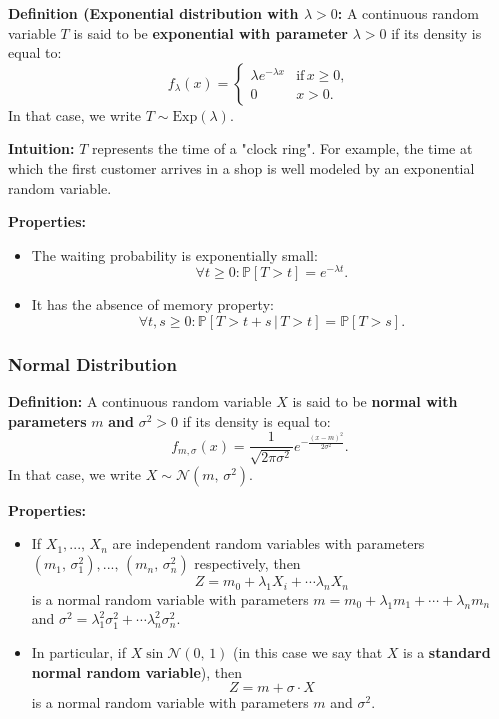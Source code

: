 \documentclass[a4paper]{extarticle}
\begin{document}
\textbf{Definition (Exponential distribution with \(\lambda > 0\):} A continuous random variable \(T\) is said to be \textbf{exponential with parameter} \(\lambda > 0\) if its density is equal to:
\[
    f_{\lambda}(x) = \begin{cases}
        \lambda e^{-\lambda x} & \text{if} \, x \geq 0,\\
        0 & x > 0.
    \end{cases}
\]
In that case, we write \(T \sim \text{Exp}(\lambda)\).

\textbf{Intuition:} \(T\) represents the time of a "clock ring". For example, the time at which the first customer arrives in a shop is well modeled by an exponential random variable.

\textbf{Properties:}
\begin{itemize}
    \item The waiting probability is exponentially small:
    \[
        \forall t \geq 0 : \mathbb{P}[T > t] = e^{-\lambda t}.
    \]
    \item It has the absence of memory property:
    \[
        \forall t, s \geq 0 : \mathbb{P}[T > t + s \, | \, T > t] = \mathbb{P}[T > s].
    \]
\end{itemize}

\subsubsection{Normal Distribution}

\textbf{Definition:} A continuous random variable \(X\) is said to be \textbf{normal with parameters} \(m\) \textbf{and} \(\sigma^2 > 0\) if its density is equal to:
\[
    f_{m, \sigma}(x) = \frac{1}{\sqrt{2 \pi \sigma^2}} e^{-\frac{(x - m)^2}{2 \sigma^2}}.
\]
In that case, we write \(X \sim \mathcal{N}(m, \, \sigma^2)\).

\textbf{Properties:}

\begin{itemize}
    \item If \(X_1,..., \, X_n\) are independent random variables with parameters \((m_1, \, \sigma_1^2),..., \, (m_n, \, \sigma_n^2)\) respectively, then
    \[
        Z = m_0 + \lambda_1 X_i + \cdots \lambda_n X_n
    \]
    is a normal random variable with parameters \(m = m_0 + \lambda_1m_1 + \cdots + \lambda_n m_n\) and \(\sigma^2 = \lambda_1^2 \sigma_1^2 + \cdots \lambda_n^2 \sigma_n^2\).
    \item In particular, if \(X \sin \mathcal{N}(0, \, 1)\) (in this case we say that \(X\) is a \textbf{standard normal random variable}), then
    \[
        Z = m + \sigma \cdot X
    \]
    is a normal random variable with parameters \(m\) and \(\sigma^2\).
\end{itemize}
\end{document}

